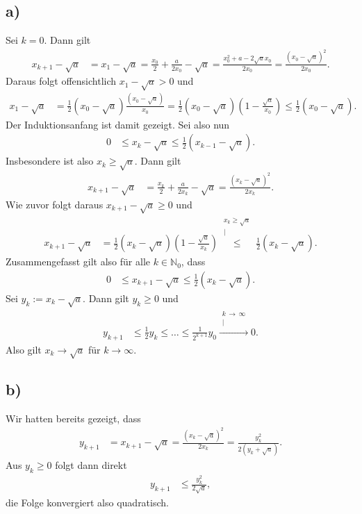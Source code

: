 \documentclass[english, parskip=full]{scrartcl}
\newcommand{\kom}{}
\newcommand{\kla}{}
\begin{document}
\subsection*{a)}
Sei $k=0$.
Dann gilt
\begin{align}
x_{k+1} - \sqrt{a} &= x_1 - \sqrt{a} = \frac{x_0}{2} + \frac{a}{2x_0} - \sqrt{a} = \frac{x_0^2 + a - 2\sqrt{a} x_0}{2x_0} = \frac{(x_0 - \sqrt{a})^2}{2x_0}.
\end{align}
Daraus folgt offensichtlich $x_1 - \sqrt{a} > 0$ und
\begin{align}
x_{1} - \sqrt{a} &=  \frac{1}{2} (x_0 - \sqrt{a})  \frac{(x_0 - \sqrt{a})}{x_0} = \frac{1}{2} (x_0 - \sqrt{a}) \kla\left( {1 - \frac{\sqrt{a}}{x_0}} \right) \le \frac{1}{2} (x_0 - \sqrt{a}) .
\end{align}
Der Induktionsanfang ist damit gezeigt. 
Sei also nun 
\begin{align}
0 &\le x_k - \sqrt{a} \le \frac{1}{2} (x_{k-1} - \sqrt{a}) .
\end{align}
Insbesondere ist also $x_k \ge \sqrt{a}$.
Dann gilt
\begin{align}
x_{k+1} - \sqrt{a} &= \frac{x_{k}}{2} + \frac{a}{2x_{k}} - \sqrt{a} = \frac{(x_{k} - \sqrt{a})^2}{2x_{k}}.
\end{align}
Wie zuvor folgt daraus $x_{k+1} -\sqrt{a} \ge 0$ und
\begin{align}
x_{k+1} - \sqrt{a} &= \frac{1}{2} (x_{k} - \sqrt{a})  \kla\left( {1 - \frac{\sqrt{a}}{x_{k}}} \right) \kom\overset{\substack{{x_k \ge \sqrt{a}} \\ |}}{\le} \frac{1}{2} (x_k - \sqrt{a}). 
\end{align}
Zusammengefasst gilt also für alle $k\in\mathbb{N}_0$, dass
\begin{align}
0 &\le x_{k+1} - \sqrt{a} \le \frac{1}{2}(x_k - \sqrt{a}).
\end{align}
Sei $y_k := x_k - \sqrt{a}$.
Dann gilt $y_k \ge 0$ und 
\begin{align}
y_{k+1} &\le \frac{1}{2}y_k \le \dots \le \frac{1}{2^{k+1}}y_0 \kom\overset{\substack{{k \, \rightarrow\, \infty} \\ |}}{\longrightarrow} 0.
\end{align}
Also gilt $x_k \rightarrow \sqrt{a}$ für $k \rightarrow\infty$.

\subsection*{b)}
Wir hatten bereits gezeigt, dass
\begin{align}
y_{k+1} &= x_{k+1} - \sqrt{a} = \frac{(x_k - \sqrt{a})^2}{2x_k} = \frac{y_k^2}{2(y_k + \sqrt{a})}.
\end{align}
Aus $y_k\ge0$ folgt dann direkt
\begin{align}
y_{k+1} &\le \frac{y_k^2}{2\sqrt{a}},
\end{align}
die Folge konvergiert also quadratisch.
\end{document}
